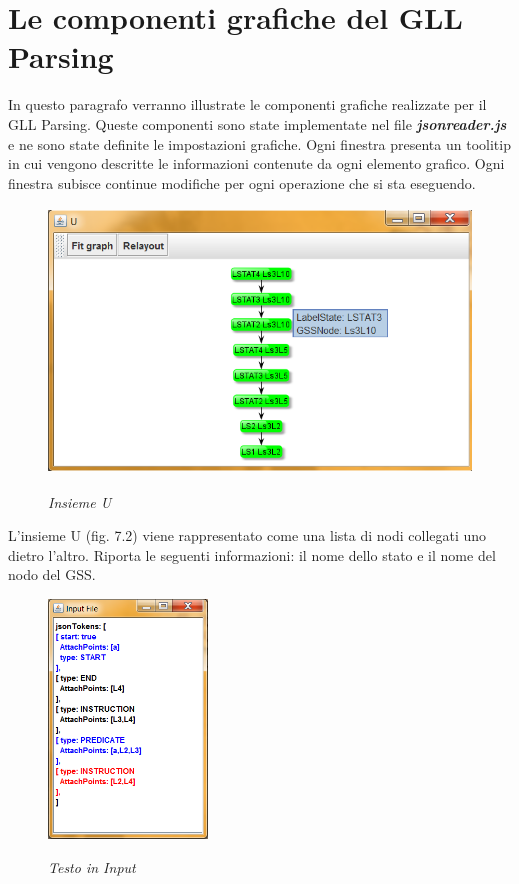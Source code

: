 \section{Le componenti grafiche del GLL Parsing}
In questo paragrafo verranno illustrate le componenti grafiche realizzate per il GLL Parsing. Queste componenti sono state implementate nel file \textbf{\textit{jsonreader.js}} e ne sono state definite le impostazioni grafiche. Ogni finestra presenta un toolitip in cui vengono descritte le informazioni contenute da ogni elemento grafico. Ogni finestra subisce continue modifiche per ogni operazione che si sta eseguendo.\par
\begin{figure}[hbpb]\label{insiemeU}
	\centering
	{\includegraphics[height=200pt,width=320pt,scale=0.1]{files/InsiemeU.png}}
	\caption{\textit{Insieme U}}
\end{figure}
\noindent L'insieme U (fig. 7.2) viene rappresentato come una lista di nodi collegati uno dietro l'altro. Riporta le seguenti informazioni: il nome dello stato e il nome del nodo del GSS.\par
\begin{figure}[h]\label{input}
	\centering
	{\includegraphics[height=180pt,width=120pt,scale=0.1]{files/Input.png}}
	\caption{\textit{Testo in Input}}
\end{figure}
